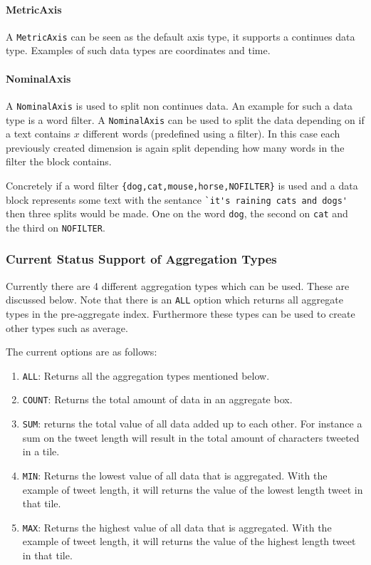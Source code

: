 \paragraph{MetricAxis}
A \lstinline|MetricAxis| can be seen as the default axis type, it supports a continues data type. Examples of such data types are coordinates and time.

\paragraph{NominalAxis}
A \lstinline|NominalAxis| is used to split non continues data. An example for such a data type is a word filter. A \lstinline|NominalAxis| can be used to split the data depending on if a text contains $x$ different words (predefined using a filter). In this case each previously created dimension is again split depending how many words in the filter the block contains. 

Concretely if a word filter \lstinline|{dog,cat,mouse,horse,NOFILTER}| is used and a data block represents some text with the sentance \lstinline|`it's raining cats and dogs'| then three splits would be made. One on the word \lstinline|dog|, the second on \lstinline|cat| and the third on \lstinline|NOFILTER|.

\subsubsection{Current Status Support of Aggregation Types}
Currently there are 4 different aggregation types which can be used. These are discussed below. Note that there is an \lstinline|ALL| option which returns all aggregate types in the pre-aggregate index. Furthermore these types can be used to create other types such as average.

The current options are as follows:
\begin{enumerate}
\item \lstinline|ALL|: 	Returns all the aggregation types mentioned below.
\item \lstinline|COUNT|: Returns the total amount of data in an aggregate box.
\item \lstinline|SUM|: returns the total value of all data added up to each other. For instance a sum on the tweet length will result in the total amount of characters tweeted in a tile.
\item \lstinline|MIN|: Returns the lowest value of all data that is aggregated. With the example of tweet length, it will returns the value of the lowest length tweet in that tile.
\item \lstinline|MAX|: Returns the highest value of all data that is aggregated. With the example of tweet length, it will returns the value of the highest length tweet in that tile.
\end{enumerate}

